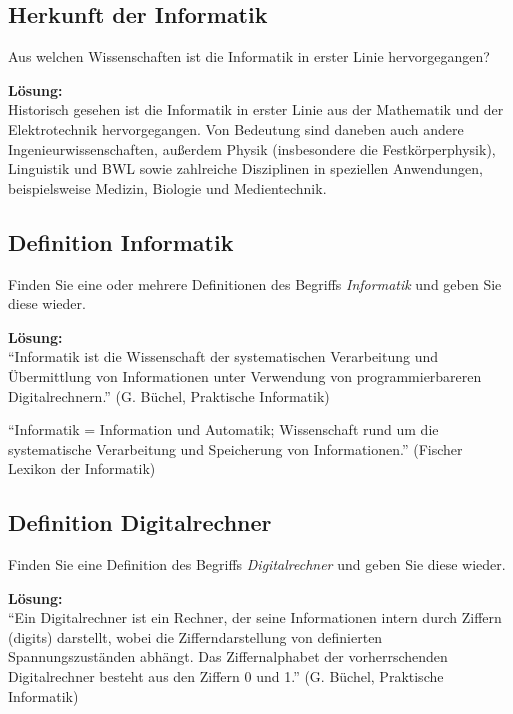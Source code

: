 \documentclass[11pt,a4paper,DIV=12]{scrartcl}
\date{\today}
\author{Max Mustermann\\ (1992822)}
\newcommand{\loesung}{\textbf{Lösung:}\\}
\begin{document}
\maketitle       %

\subsection{Herkunft der Informatik}

Aus welchen Wissenschaften ist die Informatik in erster Linie hervorgegangen?

\loesung
Historisch gesehen ist die Informatik in erster Linie aus der Mathematik und der Elektrotechnik hervorgegangen. Von Bedeutung sind daneben auch andere Ingenieurwissenschaften, außerdem Physik (insbesondere die Festkörperphysik), Linguistik und BWL sowie zahlreiche Disziplinen in speziellen Anwendungen, beispielsweise Medizin, Biologie und Medientechnik.

\subsection{Definition Informatik}
Finden Sie eine oder mehrere Definitionen des Begriffs \emph{Informatik} und geben Sie diese wieder.

\loesung
\enquote{Informatik ist die Wissenschaft der systematischen Verarbeitung und
Übermittlung von Informationen unter Verwendung von
programmierbareren Digitalrechnern.} (G. Büchel, Praktische Informatik)

\enquote{Informatik = Information und Automatik; Wissenschaft rund um die systematische Verarbeitung und Speicherung von Informationen.} (Fischer Lexikon der Informatik)

\subsection{Definition Digitalrechner}
Finden Sie eine Definition des Begriffs \emph{Digitalrechner} und geben Sie diese wieder.

\loesung
\enquote{Ein Digitalrechner ist ein Rechner, der seine Informationen intern durch Ziffern (digits) darstellt, wobei die Zifferndarstellung von definierten Spannungszuständen abhängt. Das Ziffernalphabet der vorherrschenden Digitalrechner besteht aus den Ziffern 0 und 1.} (G. Büchel, Praktische Informatik)
\end{document}
